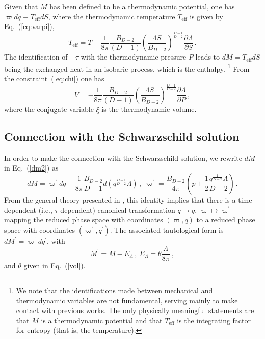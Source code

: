 \documentclass[prd,onecolumn,notitlepage,amsmath,nofootinbib,superscriptaddress,showpacs,showkeys]{revtex4-1}
\begin{document}
Given that $M$ has been defined to be a thermodynamic potential,
one has $\varpi dq\equiv T_{\mathrm{eff}}dS$, where the thermodynamic
temperature $T_{\mathrm{eff}}$ is given by Eq.~(\ref{eq:varpi}),
\begin{equation}
T_{\mathrm{eff}}=T-\frac{1}{8\pi}\frac{B_{D-2}}{\left(D-1\right)}\left(\frac{4S}{B_{D-2}}\right)^{\frac{D-1}{D-2}}\frac{\partial\Lambda}{\partial S}\,.\label{ttermo}
\end{equation}
The identification of $-\tau$ with the thermodynamic pressure $P$
leads to $dM=T_{\mathrm{eff}}dS$ being the exchanged heat in an isobaric
process, which is the enthalpy.%
\footnote{We note that the identifications made between mechanical and thermodynamic
variables are not fundamental, serving mainly to make contact with
previous works. The only physically meaningful statements are that
$M$ is a thermodynamic potential and that $T_{\mathrm{eff}}$ is
the integrating factor for entropy (that is, the temperature).%
} From the constraint~(\ref{eq:chi}) one has 
\begin{equation}
V=-\frac{1}{8\pi}\frac{B_{D-2}}{\left(D-1\right)}\left(\frac{4S}{B_{D-2}}\right)^{\frac{D-1}{D-2}}\frac{\partial\Lambda}{\partial P}\,,\label{eq:volume}
\end{equation}
where the conjugate variable $\xi$ is the thermodynamic volume.


\subsection{Connection with the Schwarzschild solution}

In order to make the connection with the Schwarzschild solution, we
rewrite $dM$ in Eq.~(\ref{dm2}) as 
\begin{equation}
dM=\varpi^{\prime}dq-\frac{1}{8\pi}\frac{B_{D-2}}{D-1}d\left(q^{\frac{D-1}{D-2}}\Lambda\right)\,,\,\,\varpi^{\prime}=\frac{B_{D-2}}{4\pi}\left(p+\frac{1}{2}\frac{q^{\frac{1}{D-2}}\Lambda}{D-2}\right)\,.
\end{equation}
From the general theory presented in \cite{baldfresmol2016}, this
identity implies that there is a time-dependent (i.e., $\tau$-dependent)
canonical transformation $q\mapsto q$, $\varpi\mapsto\varpi^{\prime}$
mapping the reduced phase space with coordinates $\left(\varpi,q\right)$
to a reduced phase space with coordinates $\left(\varpi^{\prime},q^{\prime}\right)$.
The associated tautological form is $dM^{\prime}=\varpi^{\prime}dq^{\prime}$,
with 
\begin{equation}
M^{\prime}=M-E_{\Lambda}\,,\ E_{\Lambda}=\theta\frac{\Lambda}{8\pi}~,\label{m}
\end{equation}
and $\theta$ given in Eq.~(\ref{vol}).
\end{document}
